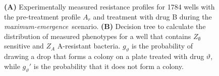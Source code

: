 \clearpage
\begin{figure}[p]
  \hfill
  \caption{
    \textbf{(A)}
    Experimentally measured resistance profiles for 1784 wells with the pre-treatment profile \( A_r \) and treatment with drug B during the \textit{maximum-emergence}~scenario.
    \textbf{(B)}
    Decision tree to calculate the distribution of measured phenotypes for a well that contains \( Z_\emptyset \) sensitive and \( Z_A \) A-resistant bacteria.
    $g_\vartheta$ is the probability of drawing a drop that forms a colony on a plate treated with drug $\vartheta$, while $g_\vartheta'$ is the probability that it does not form a colony.
  }
\end{figure}

